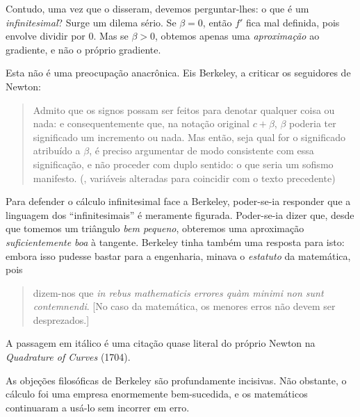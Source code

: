 \documentclass[../../../include/open-logic-section]{subfiles}
\begin{document}
Contudo, uma vez que o disseram, devemos perguntar-lhes: o que é um
\emph{infinitesimal}? Surge um dilema sério. Se $\beta = 0$, então
$f'$ fica mal definida, pois envolve dividir por $0$. Mas se $\beta >
0$, obtemos apenas uma \emph{aproximação} ao gradiente, e não o
próprio gradiente.

Esta não é uma preocupação anacrônica. Eis Berkeley, a criticar os
seguidores de Newton:
\begin{quote}
Admito que os signos possam ser feitos para denotar qualquer coisa ou nada:
e consequentemente que, na notação original $c + \beta$, $\beta$
poderia ter significado um incremento ou nada. Mas então, seja qual for
o significado atribuído a $\beta$, é preciso argumentar de modo consistente com
essa significação, e não proceder com duplo sentido: o que seria um sofismo manifesto. (\citealt[\S{}XIII]{Berkeley1734},
variáveis alteradas para coincidir com o texto precedente)
\end{quote}
Para defender o cálculo infinitesimal face a Berkeley, poder-se-ia responder
que a linguagem dos ``infinitesimais'' é meramente figurada. Poder-se-ia
dizer que, desde que tomemos um triângulo \emph{bem pequeno}, obteremos
uma aproximação \emph{suficientemente boa} à tangente. Berkeley tinha
também uma resposta para isto: embora isso pudesse bastar para a engenharia,
minava o \emph{estatuto} da matemática, pois
\begin{quote}
dizem-nos que \emph{in rebus mathematicis errores qu\`{a}m minimi
non sunt contemnendi}. [No caso da matemática, os menores
erros não devem ser desprezados.] \citep[\S{}IX]{Berkeley1734}
\end{quote}
A passagem em itálico é uma citação quase literal do próprio Newton na
\emph{Quadrature of Curves} (1704).

As objeções filosóficas de Berkeley são profundamente incisivas. Não obstante,
o cálculo foi uma empresa enormemente bem-sucedida, e os matemáticos
continuaram a usá-lo sem incorrer em erro.
\end{document}
